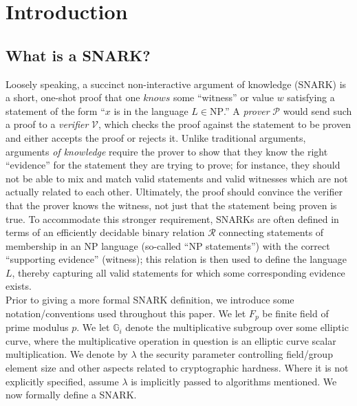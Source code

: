 \section{Introduction}\label{sec:intro}
\subsection{What is a SNARK?}\label{subsec:snark}
\noindent Loosely speaking, a succinct non-interactive argument of knowledge (SNARK) is a short, one-shot proof that one $knows$ some ``witness'' or value $w$ satisfying a statement of the form ``$x$ is in the language $L \in \text{NP}$.'' A \textit{prover} $\mathcal{P}$ would send such a proof to a \textit{verifier} $\mathcal{V}$, which checks the proof against the statement to be proven and either accepts the proof or rejects it. Unlike traditional arguments, arguments \textit{of knowledge} require the prover to show that they know the right ``evidence'' for the statement they are trying to prove; for instance, they should not be able to mix and match valid statements and valid witnesses which are not actually related to each other. Ultimately, the proof should convince the verifier that the prover knows the witness, not just that the statement being proven is true. To accommodate this stronger requirement, SNARKs are often defined in terms of an efficiently decidable binary relation $\mathcal{R}$ connecting statements of membership in an NP language (so-called ``NP statements'') with the correct ``supporting evidence'' (witness); this relation is then used to define the language $L$, thereby capturing all valid statements for which some corresponding evidence exists.\\ 

\noindent Prior to giving a more formal SNARK definition, we introduce some notation/conventions used throughout this paper. We let $F_p$ be finite field of prime modulus $p$. We let $\mathbb{G}_i$ denote the multiplicative subgroup over some elliptic curve, where the multiplicative operation in question is an elliptic curve scalar multiplication. We denote by $\lambda$ the security parameter controlling field/group element size and other aspects related to cryptographic hardness. Where it is not explicitly specified, assume $\lambda$ is implicitly passed to algorithms mentioned. We now formally define a SNARK.\\  

